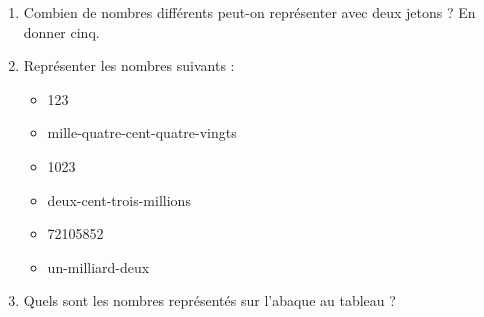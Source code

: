 \begin{activite}
\begin{enumerate}
            \item Combien de nombres différents peut-on représenter avec deux jetons ? En donner cinq.
            \item Représenter les nombres suivants :
            \begin{multicols}{2}
                \begin{itemize}
                    \item 123
                    \item mille-quatre-cent-quatre-vingts
                    \item \num{1023}
                    \item deux-cent-trois-millions
                    \item \num{72105852}
                    \item un-milliard-deux                        
                \end{itemize}
            \end{multicols}
            \item Quels sont les nombres représentés sur l'abaque au tableau ?
        \end{enumerate}
  \end{activite}
 
